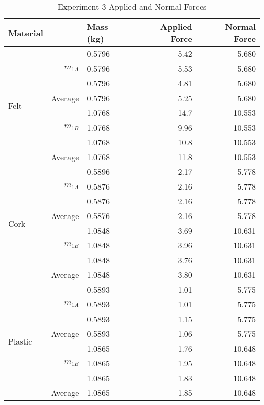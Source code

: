 \documentclass [12pt, letterpaper, twoside] {article}
\begin{document}
\begin {table}[h]
  \centering
  \begin {tabular} {| l | r | l | r | r |}
    \hline\hline 
    Material & & Mass (kg) & Applied Force & Normal Force \\
    \hline
    \multirow {8}{*}{Felt} & \multirow {3}{*}{\(m_{1A}\)} & 0.5796 & 5.42 & 5.680 \\ %
    & & 0.5796 & 5.53 & 5.680 \\ %
    & & 0.5796 & 4.81 & 5.680 \\ %
    \cline{2-5}
    & Average & 0.5796 & 5.25 & 5.680 \\ %
    \cline{2-5}
    & \multirow {3}{*}{\(m_{1B}\)} & 1.0768 & 14.7 & 10.553 \\ %
    & & 1.0768 & 9.96 & 10.553 \\ %
    & & 1.0768 & 10.8 & 10.553 \\ %
    \cline{2-5}
    & Average & 1.0768 & 11.8 & 10.553 \\ %
    \hline
    \multirow {8}{*}{Cork} & \multirow {3}{*}{\(m_{1A}\)} & 0.5896 & 2.17 & 5.778 \\ %
    & & 0.5876 & 2.16 & 5.778 \\ %
    & & 0.5876 & 2.16 & 5.778 \\ %
    \cline{2-5}
    & Average & 0.5876 & 2.16 & 5.778 \\ %
    \cline{2-5}
    & \multirow {3}{*}{\(m_{1B}\)} & 1.0848 & 3.69 & 10.631 \\ %
    & & 1.0848 & 3.96 & 10.631 \\ %
    & & 1.0848 & 3.76 & 10.631 \\ %
    \cline{2-5}
    & Average & 1.0848 & 3.80 & 10.631 \\ %
    \cline{2-5}
    \hline
    \multirow {8}{*}{Plastic} & \multirow {3}{*}{\(m_{1A}\)} & 0.5893 & 1.01 & 5.775 \\ %
    & & 0.5893 & 1.01 & 5.775 \\ %
    & & 0.5893 & 1.15 & 5.775 \\ %
    \cline{2-5}
    & Average & 0.5893 & 1.06 & 5.775 \\ %
    \cline{2-5}
    & \multirow {3}{*}{\(m_{1B}\)} & 1.0865 & 1.76 & 10.648 \\ %
    & & 1.0865 & 1.95 & 10.648 \\ %
    & & 1.0865 & 1.83 & 10.648 \\ %
    \cline{2-5}
    & Average & 1.0865 & 1.85 & 10.648 \\ %
    \hline\hline
  \end {tabular}
  \caption {Experiment 3 Applied and Normal Forces}
\end {table}
\end{document}
